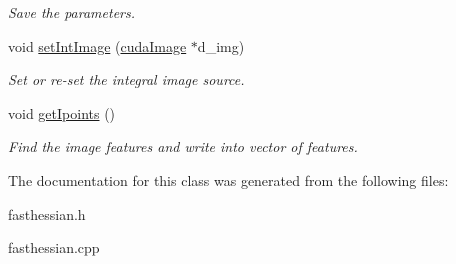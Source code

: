 \begin{DoxyCompactItemize}
\begin{DoxyCompactList}\small\item\em Save the parameters. \end{DoxyCompactList}\item 
\hypertarget{classFastHessian_a085b477fbb67ddf81390f97c2e363af1}{void \hyperlink{classFastHessian_a085b477fbb67ddf81390f97c2e363af1}{set\-Int\-Image} (\hyperlink{structcudaImage}{cuda\-Image} $\ast$d\-\_\-img)}\label{classFastHessian_a085b477fbb67ddf81390f97c2e363af1}

\begin{DoxyCompactList}\small\item\em Set or re-\/set the integral image source. \end{DoxyCompactList}\item 
\hypertarget{classFastHessian_a547026f2fa69b4a6f4c2b3556251290a}{void \hyperlink{classFastHessian_a547026f2fa69b4a6f4c2b3556251290a}{get\-Ipoints} ()}\label{classFastHessian_a547026f2fa69b4a6f4c2b3556251290a}

\begin{DoxyCompactList}\small\item\em Find the image features and write into vector of features. \end{DoxyCompactList}\end{DoxyCompactItemize}


The documentation for this class was generated from the following files\-:\begin{DoxyCompactItemize}
\item 
fasthessian.\-h\item 
fasthessian.\-cpp\end{DoxyCompactItemize}
